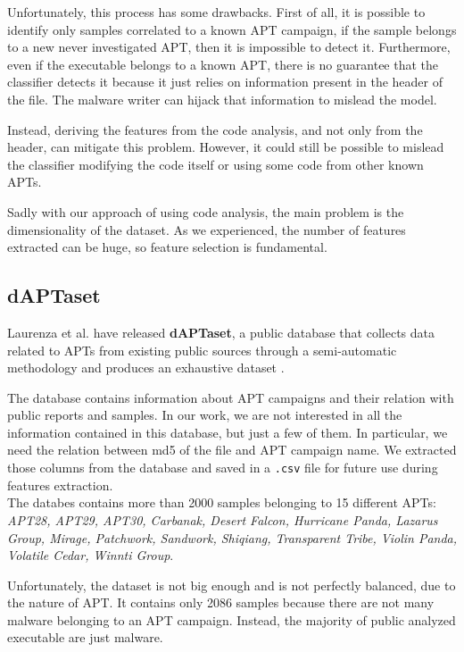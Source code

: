 Unfortunately, this process has some drawbacks. First of all, it is possible to identify only samples correlated to a known APT campaign, if the sample belongs to a new never investigated APT, then it is impossible to detect it. Furthermore, even if the executable belongs to a known APT, there is no guarantee that the classifier detects it because it just relies on information present in the header of the file. The malware writer can hijack that information to mislead the model. 

Instead, deriving the features from the code analysis, and not only from the header, can mitigate this problem. However, it could still be possible to mislead the classifier modifying the code itself or using some code from other known APTs.

Sadly with our approach of using code analysis, the main problem is the dimensionality of the dataset. As we experienced, the number of features extracted can be huge, so feature selection is fundamental.




\subsection{dAPTaset}

Laurenza et al. have released \textbf{dAPTaset}, a public database that collects data related to APTs from existing public sources through a semi-automatic methodology and produces an exhaustive dataset \cite{daptaset}.

The database contains information about APT campaigns and their relation with public reports and samples. In our work, we are not interested in all the information contained in this database, but just a few of them. In particular, we need the relation between md5 of the file and APT campaign name. We extracted those columns from the database and saved in a \texttt{.csv} file for future use during features extraction.
\\

The databes contains more than 2000 samples belonging to 15 different APTs: \textit{APT28,
APT29, APT30, Carbanak, Desert Falcon, Hurricane Panda, Lazarus Group, Mirage, Patchwork,
Sandwork, Shiqiang, Transparent Tribe, Violin Panda, Volatile Cedar, Winnti Group}.

Unfortunately, the dataset is not big enough and is not perfectly balanced, due to the nature of APT. It contains only 2086 samples because there are not many malware belonging to an APT campaign. Instead, the majority of public analyzed executable are just malware.

